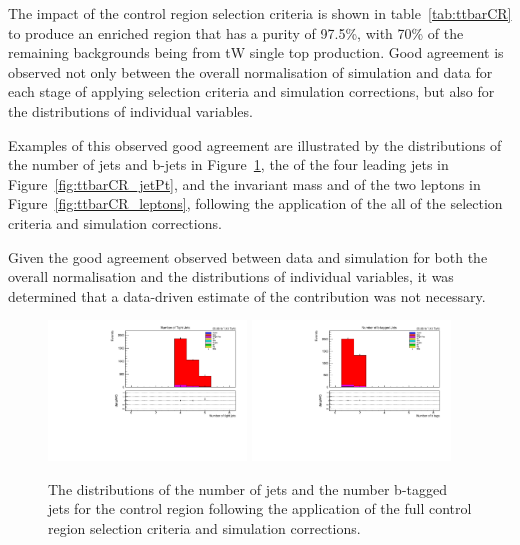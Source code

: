 The impact of the \ttbar control region selection criteria is shown in table~\ref{tab:ttbarCR} to produce an enriched region that has a purity of 97.5\%, with 70\% of the remaining backgrounds being from tW single top production.
Good agreement is observed not only between the overall normalisation of simulation and data for each stage of applying selection criteria and simulation corrections, but also for the distributions of individual variables.

Examples of this observed good agreement are illustrated by the distributions of the number of jets and b-jets in Figure~\ref{fig:ttbarCR_nJets}, the \pT of the four leading jets in Figure~\ref{fig:ttbarCR_jetPt}, and the invariant mass and \pT of the two leptons in Figure~\ref{fig:ttbarCR_leptons}, following the application of the all of the selection criteria and simulation corrections.

Given the good agreement observed between data and simulation for both the overall normalisation and the distributions of individual variables, it was determined that a data-driven estimate of the \ttbar contribution was not necessary.

\begin{figure}[tbp]
\centering
\includegraphics[width=0.47\textwidth]{figs/background-estimation/plots/unblinded/ttbar_control/numJets_wMass.pdf}
\includegraphics[width=0.47\textwidth]{figs/background-estimation/plots/unblinded/ttbar_control/numBJets_Wmass.pdf}
\caption{
The distributions of the number of jets and the number b-tagged jets for the \ttbar control region following the application of the full control region selection criteria and simulation corrections.
}
\label{fig:ttbarCR_nJets}
\end{figure}

